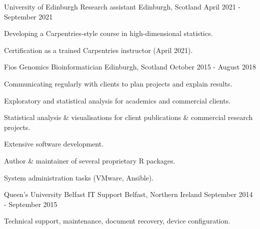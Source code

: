 


\begin{cventries}
\cventry
{University of Edinburgh} %
{Research assistant} %
{Edinburgh, Scotland} %
{April 2021 - September 2021} %
{ %
    \begin{cvitems}
        \item {
            Developing a Carpentries-style course in high-dimensional statistics.
        }
        \item {
            Certification as a trained Carpentries instructor (April 2021).
        }
    \end{cvitems}
}

\cventry
{Fios Genomics} %
{Bioinformatician} %
{Edinburgh, Scotland} %
{October 2015 - August 2018} %
{ %
    \begin{cvitems}
        \item {
            Communicating regularly with clients to plan projects and explain 
            results.
        }
        \item {
            Exploratory and statistical analysis for academics and commercial 
            clients.
        }
        \item {
            Statistical analysis \& visualisations for client publications \& 
            commercial research projects.
        }
        \item {Extensive software development.}
        \item {Author \& maintainer of several proprietary R packages.}
        \item {System administration tasks (VMware, Ansible).}
    \end{cvitems}
}

\cventry
{Queen's University Belfast} %
{IT Support} %
{Belfast, Northern Ireland} %
{September 2014 - September 2015} %
{ %
    \begin{cvitems}
        \item {Technical support, maintenance, document recovery, device configuration.}
    \end{cvitems}
}


\end{cventries}
